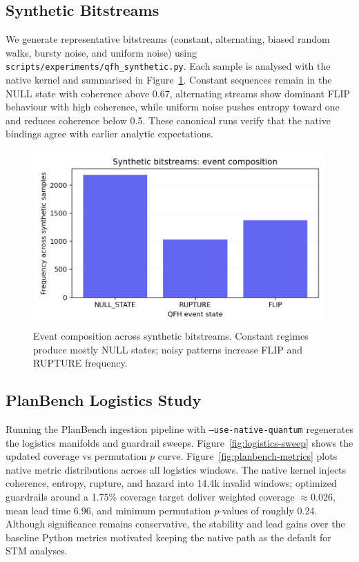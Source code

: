 \documentclass[11pt]{article}
\begin{document}
\subsection{Synthetic Bitstreams}
We generate representative bitstreams (constant, alternating, biased random walks, bursty noise, and uniform noise) using \texttt{scripts/experiments/qfh\_synthetic.py}. Each sample is analysed with the native kernel and summarised in Figure~\ref{fig:synthetic-events}. Constant sequences remain in the NULL state with coherence above 0.67, alternating streams show dominant FLIP behaviour with high coherence, while uniform noise pushes entropy toward one and reduces coherence below 0.5. These canonical runs verify that the native bindings agree with earlier analytic expectations.

\begin{figure}[t]
  \centering
  \includegraphics[width=0.75\linewidth]{../figures/fig0_synthetic_event_hist.png}
  \caption{Event composition across synthetic bitstreams. Constant regimes produce mostly NULL states; noisy patterns increase FLIP and RUPTURE frequency.}
  \label{fig:synthetic-events}
\end{figure}

\subsection{PlanBench Logistics Study}
Running the PlanBench ingestion pipeline with \texttt{--use-native-quantum} regenerates the logistics manifolds and guardrail sweeps. Figure~\ref{fig:logistics-sweep} shows the updated coverage vs permutation $p$ curve. Figure~\ref{fig:planbench-metrics} plots native metric distributions across all logistics windows. The native kernel injects coherence, entropy, rupture, and hazard into 14.4k invalid windows; optimized guardrails around a 1.75\% coverage target deliver weighted coverage $\approx 0.026$, mean lead time $6.96$, and minimum permutation $p$-values of roughly 0.24. Although significance remains conservative, the stability and lead gains over the baseline Python metrics motivated keeping the native path as the default for STM analyses.
\end{document}
